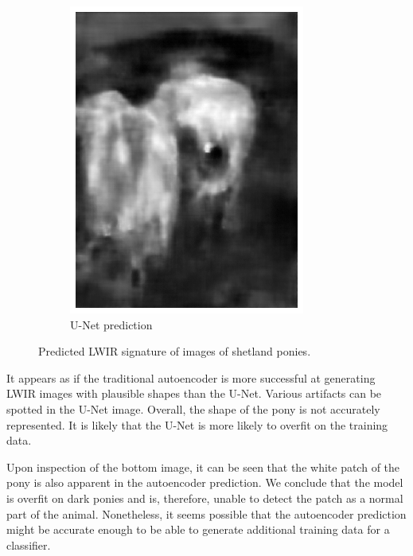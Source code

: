 \documentclass{l4proj}
\begin{document}
\begin{figure}[ht]
\begin{subfigure}[h!]{0.22\textwidth}
    \includegraphics[width=\textwidth]{images/autoencoder/pony_2/unet.png}
    \caption{U-Net prediction}
  \end{subfigure}
  \caption{Predicted LWIR signature of images of shetland ponies.}
  \label{fig:autoencoder_pony}
\end{figure}

It appears as if the traditional autoencoder is more successful at generating LWIR images with plausible shapes than the U-Net. Various artifacts can be spotted in the U-Net image. Overall, the shape of the pony is not accurately represented. It is likely that the U-Net is more likely to overfit on the training data.

Upon inspection of the bottom image, it can be seen that the white patch of the pony is also apparent in the autoencoder prediction. We conclude that the model is overfit on dark ponies and is, therefore, unable to detect the patch as a normal part of the animal. Nonetheless, it seems possible that the autoencoder prediction might be accurate enough to be able to generate additional training data for a classifier.
\end{document}

